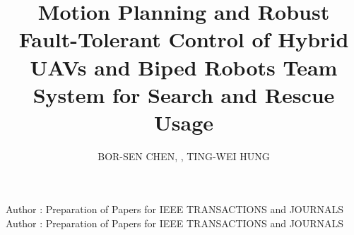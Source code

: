 \documentclass{ieeeaccess}
\begin{document}



\title{Motion Planning and Robust Fault-Tolerant Control of Hybrid UAVs and Biped Robots Team System for Search and Rescue Usage}

\author{\uppercase{Bor-Sen Chen}, , \uppercase{Ting-Wei Hung}}

\address[1]{Department of Electrical Engineering, National Tsing Hua
University, Hsinchu 30013, Taiwan} \address[2]{Department of Electrical
Engineering, Yuan Ze University, Taoyuan 32003, Taiwan}


\markboth
{Author \headeretal: Preparation of Papers for IEEE TRANSACTIONS and JOURNALS}
{Author \headeretal: Preparation of Papers for IEEE TRANSACTIONS and JOURNALS}



\end{document}
